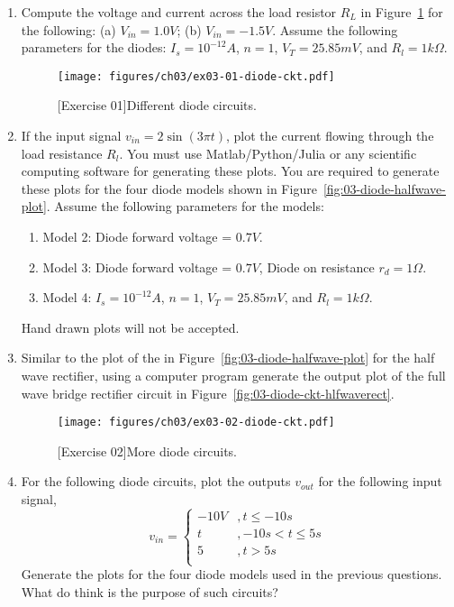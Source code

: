 \begin{enumerate}
    \item Compute the voltage and current across the load resistor $R_L$ in Figure~\ref{fig:ex03-01} for the following: (a) $V_{in} = 1.0V$; (b) $V_{in} = -1.5V$. Assume the following parameters for the diodes: $I_s = 10^{-12}A$, $n = 1$, $V_T = 25.85mV$, and $R_l = 1k\Omega$.
    \begin{figure}[htbp]
        \centering
        \texttt{[image: figures/ch03/ex03-01-diode-ckt.pdf]}
        \caption{[Exercise 01]Different diode circuits.}
        \label{fig:ex03-01}
    \end{figure}

    \item If the input signal $v_{in} = 2\sin\left(3\pi t\right)$, plot the current flowing through the load resistance $R_l$. You must use Matlab/Python/Julia or any scientific computing software for generating these plots. You are required to generate these plots for the four diode models shown in Figure~\ref{fig:03-diode-halfwave-plot}. Assume the following parameters for the models:
    \begin{enumerate}
        \item Model 2: Diode forward voltage = $0.7V$.
        \item Model 3: Diode forward voltage = $0.7V$, Diode on resistance $r_d = 1\Omega$.
        \item Model 4: $I_s = 10^{-12}A$, $n = 1$, $V_T = 25.85mV$, and $R_l = 1k\Omega$.
    \end{enumerate} 
    Hand drawn plots will not be accepted.

    \item Similar to the plot of the in Figure~\ref{fig:03-diode-halfwave-plot} for the half wave rectifier, using a computer program generate the output plot of the full wave bridge rectifier circuit in Figure~\ref{fig:03-diode-ckt-hlfwaverect}.
    
    \begin{figure}[htbp]
        \centering
        \texttt{[image: figures/ch03/ex03-02-diode-ckt.pdf]}
        \caption{[Exercise 02]More diode circuits.}
        \label{fig:ex03-02}
    \end{figure}
    
    \item For the following diode circuits, plot the outputs $v_{out}$ for the following input signal,
    \[ v_{in} = \begin{cases}
        -10V &, t \leq -10s \\
        t &, -10s < t \leq 5s \\
        5 &, t > 5s \\
        \end{cases} \]
    Generate the plots for the four diode models used in the previous questions. What do think is the purpose of such circuits?


\end{enumerate}
